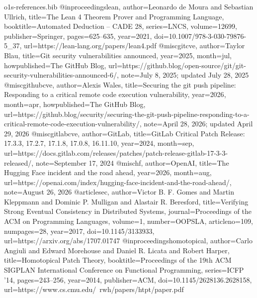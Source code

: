 \begin{filecontents*}[overwrite]{o1s-references.bib}
@inproceedings{lean, author={Leonardo de Moura and Sebastian Ullrich}, title={The Lean 4 Theorem Prover and Programming Language}, booktitle={Automated Deduction -- CADE 28}, series={LNCS}, volume={12699}, publisher={Springer}, pages={625--635}, year={2021}, doi={10.1007/978-3-030-79876-5_37}, url={https://lean-lang.org/papers/lean4.pdf}}
@misc{gitcve, author={Taylor Blau}, title={Git security vulnerabilities announced}, year={2025}, month=jul, howpublished={The GitHub Blog}, url={https://github.blog/open-source/git/git-security-vulnerabilities-announced-6/}, note={July 8, 2025; updated July 28, 2025}}
@misc{githubcve, author={Alexis Wales}, title={Securing the git push pipeline: Responding to a critical remote code execution vulnerability}, year={2026}, month=apr, howpublished={The GitHub Blog}, url={https://github.blog/security/securing-the-git-push-pipeline-responding-to-a-critical-remote-code-execution-vulnerability/}, note={April 28, 2026; updated April 29, 2026}}
@misc{gitlabcve, author={{GitLab}}, title={GitLab Critical Patch Release: 17.3.3, 17.2.7, 17.1.8, 17.0.8, 16.11.10}, year={2024}, month=sep, url={https://docs.gitlab.com/releases/patches/patch-release-gitlab-17-3-3-released/}, note={September 17, 2024}}
@misc{hf, author={{OpenAI}}, title={The Hugging Face incident and the road ahead}, year={2026}, month=aug, url={https://openai.com/index/hugging-face-incident-and-the-road-ahead/}, note={August 26, 2026}}
@article{sec, author={Victor B. F. Gomes and Martin Kleppmann and Dominic P. Mulligan and Alastair R. Beresford}, title={Verifying Strong Eventual Consistency in Distributed Systems}, journal={Proceedings of the ACM on Programming Languages}, volume={1}, number={OOPSLA}, articleno={109}, numpages={28}, year={2017}, doi={10.1145/3133933}, url={https://arxiv.org/abs/1707.01747}}
@inproceedings{homotopical, author={Carlo Angiuli and Edward Morehouse and Daniel R. Licata and Robert Harper}, title={Homotopical Patch Theory}, booktitle={Proceedings of the 19th ACM SIGPLAN International Conference on Functional Programming}, series={ICFP '14}, pages={243--256}, year={2014}, publisher={ACM}, doi={10.1145/2628136.2628158}, url={https://www.cs.cmu.edu/~rwh/papers/htpt/paper.pdf}}
\end{filecontents*}
\documentclass[sigconf,nonacm,pbalance=true]{acmart}
\usepackage{amsmath}
\usepackage{needspace}
\usepackage{booktabs}
\usepackage{enumitem}
\usepackage{tikz}
\usetikzlibrary{arrows.meta,positioning}
